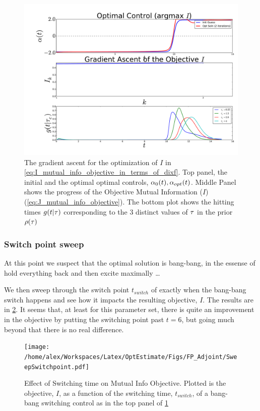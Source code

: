 \documentclass{article}
\begin{document}
\begin{figure}[htp]
\begin{center}
  \includegraphics[width=1\textwidth]{Figs/FP_Adjoint/OptControl_MI_HT_4.pdf}
  \caption[labelInTOC]{The gradient ascent for the optimization of $I$ in
  \cref{eq:I_mutual_info_objective_in_terms_of_dixf}. Top panel, the initial and
  the optimal optimal controls, ${\alpha}_{0}(t), {\alpha}_{opt}(t)$. Middle Panel
  shows the progress of the Objective Mutual Information ($I$) 
  (\cref{eq:J_mutual_info_objective}). 
  The bottom plot shows the hitting times $g(t| { \tau })$ corresponding to the 3
  distinct values of ${ \tau }$ in the prior $\rho({ \tau })$}  
  \label{fig:hitting_time_density_g_aopt_bprior}  
\end{center}   
\end{figure}  


\subsubsection{Switch point sweep}
At this point we suspect that the optimal solution is bang-bang, in the essense
of hold everything back and then excite maximally \ldots

We then sweep through the switch point $t_{switch}$ of exactly when the
bang-bang switch happens and see how it impacts the resulting objective, $I$.
The results are in \cref{fig:sweep_switchtime}. It seems that, at least for this
parameter set, there is quite an improvement in the objective by putting the switching
point past $t=6$, but going much beyond that there is no real difference. 

\begin{figure}[htp]
\begin{center}
  \texttt{[image: /home/alex/Workspaces/Latex/OptEstimate/Figs/FP\_Adjoint/SweepSwitchpoint.pdf]}
  \caption[Effect of Switching time on Mutual Info Objective]{Effect of
  Switching time on Mutual Info Objective. Plotted is the objective, $I$, as a
  function of the switching time, $t_{switch}$, of a bang-bang switching control
  as in the top panel of \cref{fig:hitting_time_density_g_aopt_bprior}}
  \label{fig:sweep_switchtime}
\end{center}
\end{figure}
\end{document}
